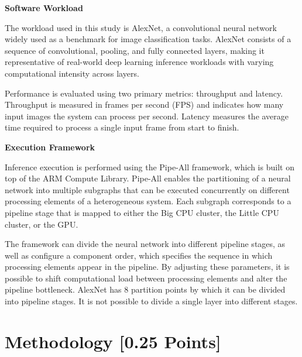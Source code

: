 \documentclass{uva-inf-article}
\begin{document}
\par\vspace{\baselineskip}

\textbf{Software Workload}

The workload used in this study is AlexNet, a convolutional neural network widely used as a benchmark for image classification tasks. AlexNet consists of a sequence of convolutional, pooling, and fully connected layers, making it representative of real-world deep learning inference workloads with varying computational intensity across layers.

Performance is evaluated using two primary metrics: throughput and latency. Throughput is measured in frames per second (FPS) and indicates how many input images the system can process per second. Latency measures the average time required to process a single input frame from start to finish.

\par\vspace{\baselineskip}

\textbf{Execution Framework}

Inference execution is performed using the Pipe-All framework, which is built on top of the ARM Compute Library. Pipe-All enables the partitioning of a neural network into multiple subgraphs that can be executed concurrently on different processing elements of a heterogeneous system. Each subgraph corresponds to a pipeline stage that is mapped to either the Big CPU cluster, the Little CPU cluster, or the GPU.

The framework can divide the neural network into different pipeline stages, as well as configure a component order, which specifies the sequence in which processing elements appear in the pipeline. By adjusting these parameters, it is possible to shift computational load between processing elements and alter the pipeline bottleneck.
AlexNet has 8 partition points by which it can be divided into pipeline stages. It is not possible to divide a single layer into different stages.



\section{Methodology [0.25 Points]} 
\end{document}
